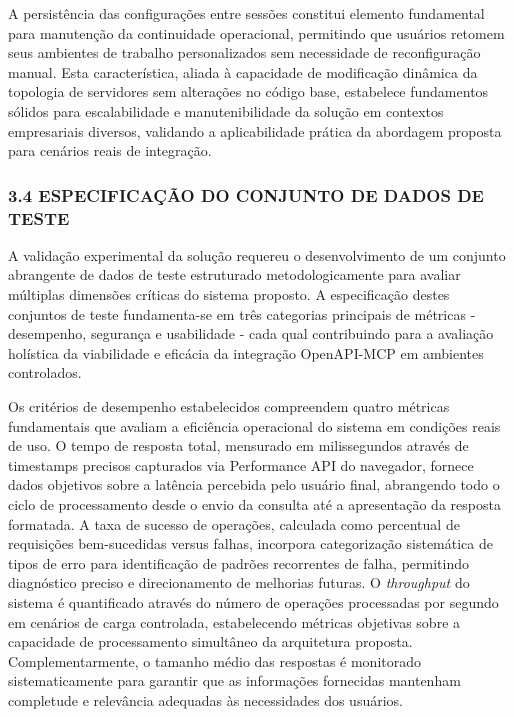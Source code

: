 \documentclass[
]{article}
\begin{document}
A persistência das configurações entre sessões constitui elemento
fundamental para manutenção da continuidade operacional, permitindo que
usuários retomem seus ambientes de trabalho personalizados sem
necessidade de reconfiguração manual. Esta característica, aliada à
capacidade de modificação dinâmica da topologia de servidores sem
alterações no código base, estabelece fundamentos sólidos para
escalabilidade e manutenibilidade da solução em contextos empresariais
diversos, validando a aplicabilidade prática da abordagem proposta para
cenários reais de integração.

\subsubsection{3.4 ESPECIFICAÇÃO DO CONJUNTO DE DADOS DE
TESTE}\label{especificauxe7uxe3o-do-conjunto-de-dados-de-teste}

A validação experimental da solução requereu o desenvolvimento de um
conjunto abrangente de dados de teste estruturado metodologicamente para
avaliar múltiplas dimensões críticas do sistema proposto. A
especificação destes conjuntos de teste fundamenta-se em três categorias
principais de métricas - desempenho, segurança e usabilidade - cada qual
contribuindo para a avaliação holística da viabilidade e eficácia da
integração OpenAPI-MCP em ambientes controlados.

Os critérios de desempenho estabelecidos compreendem quatro métricas
fundamentais que avaliam a eficiência operacional do sistema em
condições reais de uso. O tempo de resposta total, mensurado em
milissegundos através de timestamps precisos capturados via Performance
API do navegador, fornece dados objetivos sobre a latência percebida
pelo usuário final, abrangendo todo o ciclo de processamento desde o
envio da consulta até a apresentação da resposta formatada. A taxa de
sucesso de operações, calculada como percentual de requisições
bem-sucedidas versus falhas, incorpora categorização sistemática de
tipos de erro para identificação de padrões recorrentes de falha,
permitindo diagnóstico preciso e direcionamento de melhorias futuras. O
\emph{throughput} do sistema é quantificado através do número de
operações processadas por segundo em cenários de carga controlada,
estabelecendo métricas objetivas sobre a capacidade de processamento
simultâneo da arquitetura proposta. Complementarmente, o tamanho médio
das respostas é monitorado sistematicamente para garantir que as
informações fornecidas mantenham completude e relevância adequadas às
necessidades dos usuários.
\end{document}

